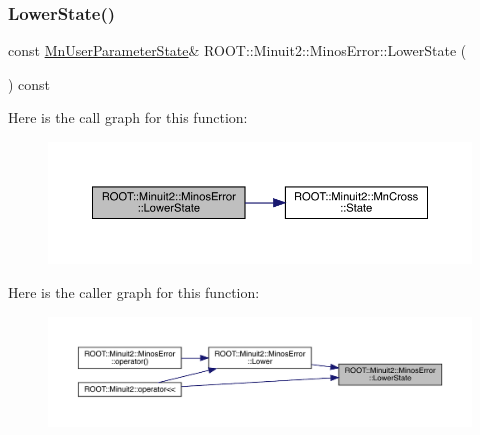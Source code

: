 \subsubsection{\texorpdfstring{LowerState()}{LowerState()}\hspace{0.1cm}{\footnotesize\ttfamily [3/3]}}
{\footnotesize\ttfamily const \mbox{\hyperlink{classROOT_1_1Minuit2_1_1MnUserParameterState}{Mn\+User\+Parameter\+State}}\& R\+O\+O\+T\+::\+Minuit2\+::\+Minos\+Error\+::\+Lower\+State (\begin{DoxyParamCaption}{ }\end{DoxyParamCaption}) const\hspace{0.3cm}{\ttfamily [inline]}}

Here is the call graph for this function\+:
\nopagebreak
\begin{figure}[H]
\begin{center}
\leavevmode
\includegraphics[width=350pt]{d2/dd1/classROOT_1_1Minuit2_1_1MinosError_ac10a407a1cb13f4e0c1b4d21383d15df_cgraph}
\end{center}
\end{figure}
Here is the caller graph for this function\+:
\nopagebreak
\begin{figure}[H]
\begin{center}
\leavevmode
\includegraphics[width=350pt]{d2/dd1/classROOT_1_1Minuit2_1_1MinosError_ac10a407a1cb13f4e0c1b4d21383d15df_icgraph}
\end{center}
\end{figure}
\mbox{\label{classROOT_1_1Minuit2_1_1MinosError_a4b8c37c90bb53d98d3b4364a5ebc2228}} 
